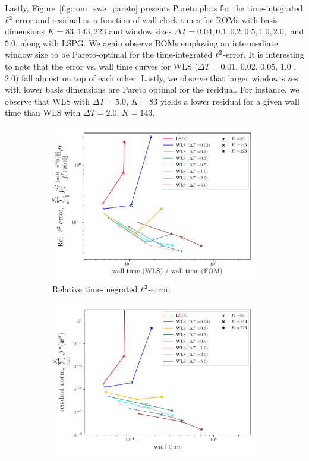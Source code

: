 Lastly, Figure~\ref{fig:rom_swe_pareto} presents Pareto plots for the time-integrated $\ell^2$-error and residual as a function of wall-clock times for ROMs with basis dimensions $K = 83,143,223$ and window sizes $\Delta T = 0.04, 0.1,0.2,0.5,1.0,2.0,$ and $5.0$, along with LSPG. We again observe ROMs employing an intermediate window size to be Pareto-optimal for the time-integrated $\ell^2$-error. It is interesting to note that the error vs. wall time curves for WLS ($\Delta T = 0.01$, $0.02$, $0.05$, $1.0$ ,$2.0$) fall almost on top of each other. Lastly, we observe that larger window sizes with lower basis dimensions are Pareto optimal for the residual. For instance, we observe that WLS with $\Delta T = 5.0$, $K=83$ yields a lower residual for a given wall time than WLS with $\Delta T = 2.0$, $K=143$. 
\begin{figure}
\begin{center}
\begin{subfigure}[t]{0.49\textwidth}
\includegraphics[trim={0cm 0cm 0cm 0cm},clip,width=1.0\linewidth]{figs/swe/swe_converge_error_pareto.pdf}
\caption{Relative time-inegrated $\ell^2$-error.}
\end{subfigure}
\begin{subfigure}[t]{0.49\textwidth}
\includegraphics[trim={0cm 0cm 0cm 0cm},clip,width=1.0\linewidth]{figs/swe/swe_converge_resid_pareto.pdf}

\end{subfigure}
\end{center}
\end{figure}
